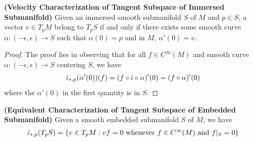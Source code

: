 \documentclass{report}
\begin{document}
\begin{theorem}
\textbf{(Velocity Characterization of Tangent Subspace of Immersed Submanifold)} Given an immersed smooth submanifold $S$ of  $M$ and  $p \in S$, a vector $v \in T_pM$ belong to $T_pS$ if and only if there exists some smooth curve  $\alpha :(-\epsilon ,\epsilon )\rightarrow S$ such that $\alpha (0)=p$ and in $M$, $\alpha '(0)=v$. 
\end{theorem}
\begin{proof}
The proof lies in observing that for all $f\in C^{\infty}(M)$ and smooth curve $\alpha :(-\epsilon  ,\epsilon )\rightarrow S$ centering $S$, we have 
\begin{align*}
\dot{\iota}_{*,p}(\alpha '(0))(f) =(f\circ \dot{\iota} \circ  \alpha)'(0)=(f\circ \alpha )'(0)  
\end{align*}
where the $\alpha '(0)$ in the first quantity is in $S$. 
\end{proof}
\begin{theorem}
\textbf{(Equivalent Characterization of Tangent Subspace of Embedded Submanifold)} Given a smooth embedded submanifold $S$ of  $M$, we have 
 \begin{align*}
\dot{\iota}_{*,p}(T_pS)=\{ v \in T_pM: vf=0\text{ whenever }f\in C^{\infty}(M)\text{ and }f|_S=0 \}  
\end{align*}
\end{theorem}
\end{document}
